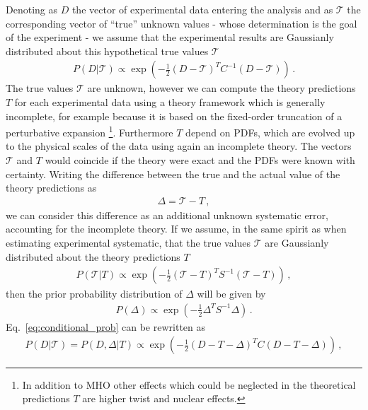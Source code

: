 %
Denoting as $D$ the vector of experimental data entering the analysis and as $\mathcal{T}$ the corresponding vector of 
``true'' unknown values - whose determination is the goal of the experiment - we assume that the experimental results
are Gaussianly distributed about this hypothetical true values $\mathcal{T}$ 
\begin{align}
    \label{eq:conditional_prob}
    P\left(D|\mathcal{T}\right) \propto
    \exp\left(-\frac{1}{2}\left(D-\mathcal{T}\right)^T C^{-1} \left(D-\mathcal{T}\right)\right)\,.
\end{align}
The true values $\mathcal{T}$ are unknown, however we can compute the theory predictions $T$ 
for each experimental data using a theory framework which is 
generally incomplete, for example because it is based on the fixed-order truncation of a perturbative
expansion \footnote{In addition to MHO other effects which could be neglected in the theoretical predictions $T$ are 
higher twist and nuclear effects.}. Furthermore $T$ depend on PDFs, which are evolved up to 
the physical scales of the data using again an incomplete theory. The vectors $\mathcal{T}$ and $T$ would coincide
if the theory were exact and the PDFs were known with certainty.
%
Writing the difference between the true and the actual value of the theory predictions as
\begin{align}
    \label{eq:shifts}
    \Delta = \mathcal{T} - T\,,
\end{align}
we can consider this difference as an additional unknown systematic error, accounting for the incomplete theory.
If we assume, in the same spirit as when estimating experimental systematic, that the true values $\mathcal{T}$ are 
Gaussianly distributed about the theory predictions $T$
\begin{align}
    \label{eq:gaussian_hyp}
    P\left(\mathcal{T}|T\right) \propto 
    \exp\left(-\frac{1}{2}\left(\mathcal{T}-T\right)^T S^{-1} \left(\mathcal{T}-T\right)\right)\,,
\end{align}
then the prior probability distribution of $\Delta$ will be given by
\begin{align}
    \label{eq:gaussian_prior_mhou}
    P\left(\Delta\right) \propto \exp\left(-\frac{1}{2}\Delta^T S^{-1} \Delta\right)\,. 
\end{align}
Eq.~\eqref{eq:conditional_prob} can be rewritten as
\begin{align}
    P\left(D|\mathcal{T}\right) = P\left(D, \Delta|T\right)  \propto 
    \exp\left(-\frac{1}{2}\left(D - T - \Delta\right)^T C \left(D-T-\Delta\right)\right)\,,   
\end{align}
